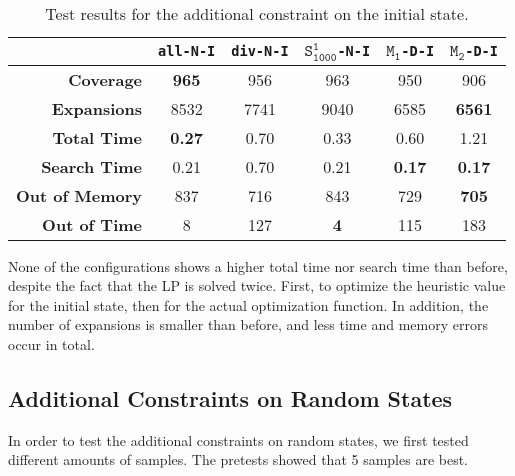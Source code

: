 \begin{table}[h!]
    \begin{center}
        \begin{tabular}{|r|c|c|c|c|c|}
            \hline
            & \textbf{\texttt{all-N-I}} & \textbf{\texttt{div-N-I}} & \textbf{$\texttt{S}_\texttt{1000}^\texttt{1}$\texttt{-N-I}} & \textbf{$\texttt{M}_\texttt{1}$\texttt{-D-I}} & \textbf{$\texttt{M}_\texttt{2}$\texttt{-D-I}} \\
            \hline \hline
            \textbf{Coverage}       & \textbf{965}  & 956   & 963       & 950           & 906 \\ \hline
            \textbf{Expansions}     & 8532          & 7741  & 9040      & 6585          & \textbf{6561} \\ \hline
            \textbf{Total Time}     & \textbf{0.27} & 0.70  & 0.33      & 0.60          & 1.21 \\ \hline
            \textbf{Search Time}    & 0.21          & 0.70  & 0.21      & \textbf{0.17} & \textbf{0.17} \\ \hline
            \textbf{Out of Memory}  & 837           & 716   & 843       & 729           & \textbf{705} \\ \hline
            \textbf{Out of Time}    & 8             & 127   & \textbf{4}& 115           & 183 \\ \hline
        \end{tabular}
        \caption{Test results for the additional constraint on the initial state.}
        \label{table:initial-constraint}
    \end{center}
\end{table}

None of the configurations shows a higher total time nor search time than before, despite the fact that the LP is solved twice.
First, to optimize the heuristic value for the initial state, then for the actual optimization function.
In addition, the number of expansions is smaller than before, and less time and memory errors occur in total.


\subsection{Additional Constraints on Random States}\label{subsec:additional-constraint-on-random-states}
In order to test the additional constraints on random states, we first tested different amounts of samples.
The pretests showed that 5 samples are best.

